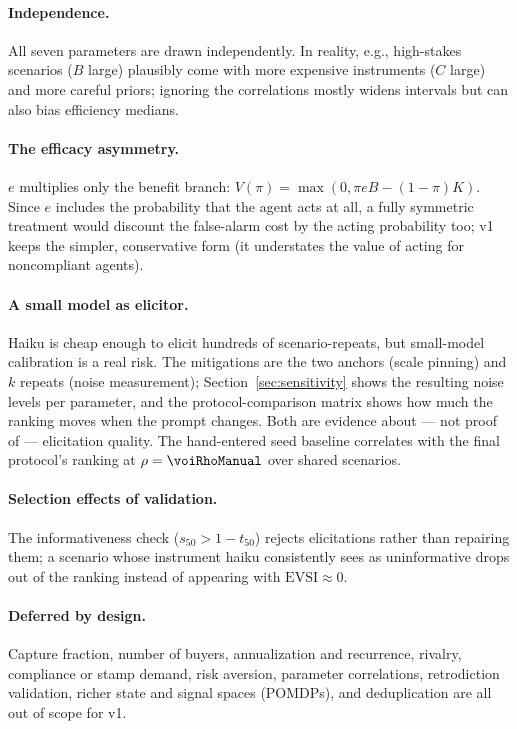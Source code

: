 \documentclass[11pt]{article}
\newcommand{\evsi}{\mathrm{EVSI}}
\begin{document}
\paragraph{Independence.} All seven parameters are drawn independently. In
reality, e.g., high-stakes scenarios ($B$ large) plausibly come with more
expensive instruments ($C$ large) and more careful priors; ignoring the
correlations mostly widens intervals but can also bias efficiency medians.

\paragraph{The efficacy asymmetry.} $e$ multiplies only the benefit branch:
$V(\pi) = \max(0, \pi e B - (1-\pi)K)$. Since $e$ includes the probability
that the agent acts at all, a fully symmetric treatment would discount the
false-alarm cost by the acting probability too; v1 keeps the simpler,
conservative form (it understates the value of acting for noncompliant
agents).

\paragraph{A small model as elicitor.} Haiku is cheap enough to elicit
hundreds of scenario-repeats, but small-model calibration is a real risk. The
mitigations are the two anchors (scale pinning) and $k$ repeats (noise
measurement); Section~\ref{sec:sensitivity} shows the resulting noise levels
per parameter, and the protocol-comparison matrix shows how much the ranking
moves when the prompt changes. Both are evidence about --- not proof of ---
elicitation quality. The hand-entered seed baseline correlates with the final
protocol's ranking at $\rho = \voiRhoManual$ over \voiRhoManualN{} shared
scenarios.

\paragraph{Selection effects of validation.} The informativeness check
($s_{50} > 1 - t_{50}$) rejects elicitations rather than repairing them; a
scenario whose instrument haiku consistently sees as uninformative drops out
of the ranking instead of appearing with $\evsi \approx 0$.

\paragraph{Deferred by design.} Capture fraction, number of buyers,
annualization and recurrence, rivalry, compliance or stamp demand, risk
aversion, parameter correlations, retrodiction validation, richer state and
signal spaces (POMDPs), and deduplication are all out of scope for v1.
\end{document}
